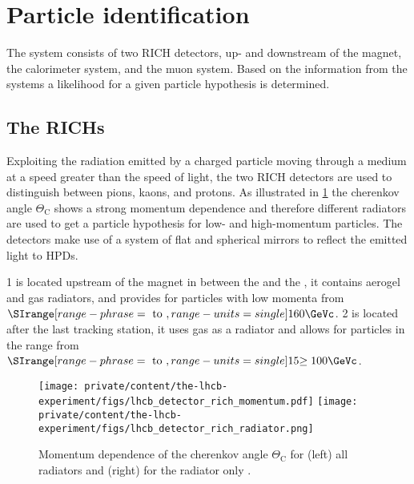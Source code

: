 \section{Particle identification}
\label{sec:lhcb_experiment:pid}

The \LHCb \PID system consists of two \ac{RICH} detectors, up- and downstream of
the magnet, the calorimeter system, and the muon system. Based on the
information from the \PID systems a likelihood for a given particle hypothesis
is determined.

\subsection{The \aclp*{RICH}}
\label{sec:lhcb_experiment:pid:rich}

Exploiting the radiation emitted by a charged particle moving through a medium
at a speed greater than the speed of light, the two \ac{RICH} detectors are used
to distinguish between pions, kaons, and protons. As illustrated in
\cref{fig:lhcb_experiment:tracking:pid:radiator} the cherenkov angle
$\mathit{\Theta}_\mathrm{C}$ shows a strong momentum dependence and therefore
different radiators are used to get a particle hypothesis for low- and
high-momentum particles. The detectors make use of a system of flat and
spherical mirrors to reflect the emitted light to \acp{HPD}.

\RICH{}1 is located upstream of the magnet in between the \VELO and the \TT, it
contains aerogel and \fluorocarbonfour gas radiators, and provides \PID for
particles with low momenta from $\SIrange[range-phrase = \text{ to },range-units
= single]{1}{60}{\GeVc}$. \RICH{}2 is located after the last tracking station,
it uses \fluorocarbon gas as a radiator and allows \PID for particles in the
range from $\SIrange[range-phrase = \text{ to },range-units =
single]{15}{\geq100}{\GeVc}$.
%
\begin{figure}[t]
  \texttt{[image: private/content/the-lhcb-experiment/figs/lhcb\_detector\_rich\_momentum.pdf]}
  \texttt{[image: private/content/the-lhcb-experiment/figs/lhcb\_detector\_rich\_radiator.png]}
  \caption{Momentum dependence of the cherenkov angle
  $\mathit{\Theta}_\mathrm{C}$ for (left) all \RICH radiators
  \cite{Alves:2008zz} and (right) for the
  \fluorocarbonfour radiator only \cite{Adinolfi:2012qfa}.}
  \label{fig:lhcb_experiment:tracking:pid:radiator}
\end{figure}


